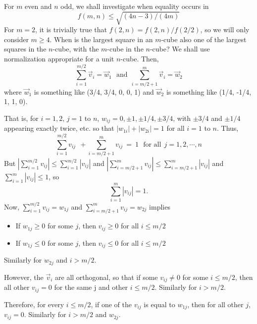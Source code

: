 For $m$ even and $n$ odd, we shall investigate when equality occurs in
\begin{equation*}
f(m,n) \leq \sqrt{(4n-3)/(4m)}
\end{equation*}
For $m = 2$, it is trivially true that $f(2,n) = f(2,n) / f(2/2)$, so we will
only consider $m \geq 4$.  When is the largest square in an $m$-cube also one
of the largest squares in the $n$-cube, with the $m$-cube in the $n$-cube?  We
shall use normalization appropriate for a unit $n$-cube.  Then,
\begin{equation*}
\sum_{i=1}^{m/2}   \vec{v}_i = \vec{w}_1 ~~~\text{and}~~
\sum_{i=m/2+1}^{m} \vec{v}_i = \vec{w}_2
\end{equation*}
where $\vec{w}_1$ is something like (3/4, 3/4, 0, 0, 1) and $\vec{w}_2$ is
something like (1/4, -1/4, 1, 1, 0).

That is, for $i = 1,2$, $j = 1$ to $n$, $w_{ij} = 0, \pm1, \pm1/4, \pm3/4$,
with $\pm3/4$ and $\pm1/4$ appearing exactly twice, etc. so that $|w_{1i}| +
|w_{2i}| = 1$ for all $i = 1$ to $n$.  Thus,
\begin{equation*}
\sum_{i=1}^{m/2}   v_{ij} ~~+
\sum_{i=m/2+1}^{m} v_{ij} ~=~ 1 ~~~\text{for all}~~ j = 1, 2, \cdots, n
\end{equation*}
But $|\sum_{i=1}^{m/2}   v_{ij}| \leq \sum_{i=1}^{m/2}   |v_{ij}|$
and $|\sum_{i=m/2+1}^{m} v_{ij}| \leq \sum_{i=m/2+1}^{m} |v_{ij}|$
and $\sum_{i=1}^{m} |v_{ij}| \leq 1$,
so
\begin{equation*}
\sum_{i=1}^{m} |v_{ij}| = 1.
\end{equation*}
Now, $\sum_{i=1}^{m/2}   v_{ij} = w_{1j}$
and  $\sum_{i=m/2+1}^{m} v_{ij} = w_{2j}$
implies
\begin{itemize}
\item[]{If $w_{1j} \geq 0$ for some $j$, then $v_{ij} \geq 0$ for all $i \leq m/2$}
\item[]{If $w_{1j} \leq 0$ for some $j$, then $v_{ij} \leq 0$ for all $i \leq m/2$}
\end{itemize}
\label{refpage19}
Similarly for $w_{2j}$ and $i > m/2$.

However, the $\vec{v}_i$ are all orthogonal, so that if some $v_{ij} \neq 0$
for some $i \leq m/2$, then all other $v_{ij} = 0$ for the same j and other $i
\leq m/2$.  Similarly for $i > m/2$.

Therefore, for every $i \leq m/2$, if one of the $v_{ij}$ is equal to
\label{refpage20}
$w_{1j}$, then for all other $j$, $v_{ij} = 0$.  Similarly for $i > m/2$ and
$w_{2j}$.

